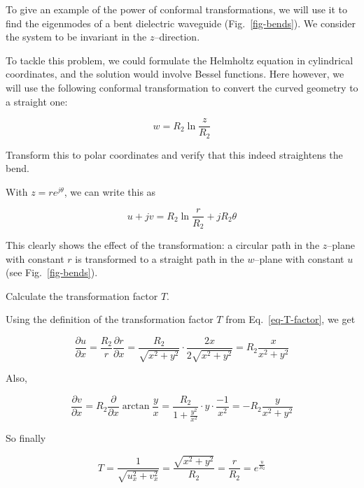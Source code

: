 To give an example of the power of conformal transformations, we will use it to find the eigenmodes of a bent dielectric waveguide (Fig.~\ref{fig-bends}). We consider the system to be invariant in the $z$--direction.

To tackle this problem, we could formulate the Helmholtz equation in cylindrical
coordinates, and the solution would involve Bessel functions. Here however, we will use the following conformal transformation to convert the curved geometry to a straight one:

\begin{equation}
w = R_2 \ln \frac{z}{R_2}
\end{equation} 

\begin{cue}
Transform this to polar coordinates and verify that this indeed straightens the bend.  
\end{cue}

With $z=r e^{j \theta}$, we can write this as

\begin{equation}
u + jv = R_2 \ln \frac{r}{R_2} + j R_2 \theta
\end{equation} 

This clearly shows the effect of the transformation: a circular path in the $z$--plane with constant $r$ is transformed to a straight path in the $w$--plane with constant $u$ (see Fig.~\ref{fig-bends}).

\begin{cue}
Calculate the transformation factor $T$. 
\end{cue}

Using the definition of the transformation factor $T$ from Eq.~\ref{eq-T-factor}, we get

\begin{equation}
\frac{\partial u}{\partial x} = \frac{R_2}{r}\frac{\partial r}{\partial x} = 
\frac{R_2}{\sqrt{x^2+y^2}} \cdot \frac{2x}{2\sqrt{x^2+y^2}} = R_2
\frac{x}{x^2+y^2}
\end{equation} 

Also,

\begin{equation}
\frac{\partial v}{\partial x} = R_2 \frac{\partial}{\partial x} \arctan
\frac{y}{x} = \frac{R_2}{1 + \frac{y^2}{x^2}} \cdot y \cdot \frac{-1}{x^2}= -R_2
\frac{y}{x^2+y^2}
\end{equation} 

So finally

\begin{equation}
T = \frac{1}{\sqrt{u_x^2+v_x^2}} = \frac{\sqrt{x^2+y^2}}{R_2} =
\frac{r}{R_2}=e^{\frac{u}{R_2}}
\end{equation} 

